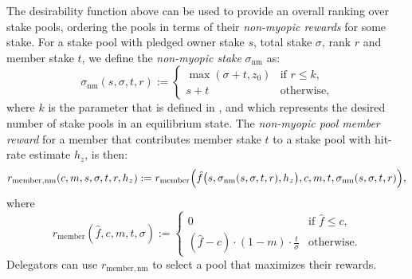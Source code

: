 \documentclass[11pt,a4paper,dvipsnames,twosided]{article}
\begin{document}
The desirability function above can be used to provide an overall ranking over stake pools,
ordering the pools in terms of their \emph{non-myopic rewards} for some stake.
For a stake pool with pledged owner stake $s$, total stake $\sigma$, rank
$r$ and member stake $t$, we define the \emph{non-myopic stake} $\sigma_\mathrm{nm}$ as:
\[
    \sigma_\mathrm{nm}(s,\sigma,t,r) :=
    \left\{
    \begin{array}{ll}
        \max(\sigma+t,z_0) &
        \text{if $r\leq k$,} \\
        s+t &
        \text{otherwise,}
    \end{array}
    \right.
\]
where $k$ is the parameter that is defined in \cite[Section 5.2]{delegation_design},
and which represents the desired number of stake pools in an equilibrium state.
%
The \emph{non-myopic pool member reward}
for a member that contributes member stake $t$ to a
stake pool with hit-rate estimate $h_z$, is then:
\[
    r_\mathrm{member, nm}(c, m, s, \sigma, t, r, h_z) :=
    r_\mathrm{member}\Bigl(\hat{f}\bigl(s,\sigma_\mathrm{nm}(s,\sigma,t,r),h_z\bigr),
    c, m, t, \sigma_\mathrm{nm}(s,\sigma,t,r)\Bigr),
\label{eq:non-myopic-member-rewards}
\]
where
\[
    r_\mathrm{member}(\hat{f}, c, m, t, \sigma) :=
    \left\{
    \begin{array}{ll}
        \displaystyle 0 &
        \text{if $\hat{f}\leq c$,} \\
        \displaystyle (\hat{f} - c)\cdot(1-m)\cdot\frac{t}{\sigma} &
        \text{otherwise.}
    \end{array}
    \right.
\]
Delegators can use $r_\mathrm{member, nm}$ to select a pool
that maximizes their rewards.



\end{document}
